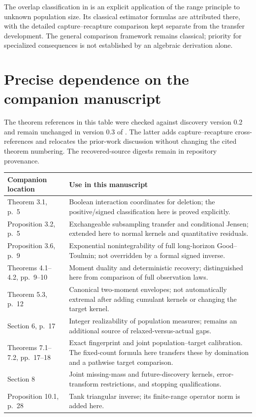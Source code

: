 \documentclass[11pt]{article}
\numberwithin{equation}{section}
\theoremstyle{definition}
\theoremstyle{remark}
\begin{document}
The overlap classification in \cite{LongCapture} is an explicit application
of the range principle to unknown population size. Its classical estimator
formulas are attributed there, with the detailed capture--recapture
comparison kept separate from the transfer development. The general
comparison framework remains classical; priority for specialized consequences
is not established by an algebraic derivation alone.

\appendix
\section{Precise dependence on the companion manuscript}\label{app:crosswalk}
The theorem references in this table were checked against discovery version 0.2 and remain unchanged in version 0.3 of \cite{LongI}. The latter adds capture--recapture cross-references and relocates the prior-work discussion without changing the cited theorem numbering. The recovered-source digests remain in repository provenance.
\begin{center}\small
\begin{tabular}{p{}p{}}
\toprule
Companion location & Use in this manuscript\\
\midrule
Theorem 3.1, p.\ 5 & Boolean interaction coordinates for deletion; the positive/signed classification here is proved explicitly.\\[3pt]
Proposition 3.2, p.\ 5 & Exchangeable subsampling transfer and conditional Jensen; extended here to normal kernels and quantitative residuals.\\[3pt]
Proposition 3.6, p.\ 9 & Exponential nonintegrability of full long-horizon Good--Toulmin; not overridden by a formal signed inverse.\\[3pt]
Theorems 4.1--4.2, pp.\ 9--10 & Moment duality and deterministic recovery; distinguished here from comparison of full observation laws.\\[3pt]
Theorem 5.3, p.\ 12 & Canonical two-moment envelopes; not automatically extremal after adding cumulant kernels or changing the target kernel.\\[3pt]
Section 6, p.\ 17 & Integer realizability of population measures; remains an additional source of relaxed-versus-actual gaps.\\[3pt]
Theorems 7.1--7.2, pp.\ 17--18 & Exact fingerprint and joint population--target calibration. The fixed-count formula here transfers these by domination and a pathwise target comparison.\\[3pt]
Section 8 & Joint missing-mass and future-discovery kernels, error-transform restrictions, and stopping qualifications.\\[3pt]
Proposition 10.1, p.\ 28 & Tank triangular inverse; its finite-range operator norm is added here.\\
\bottomrule
\end{tabular}
\end{center}
\end{document}
